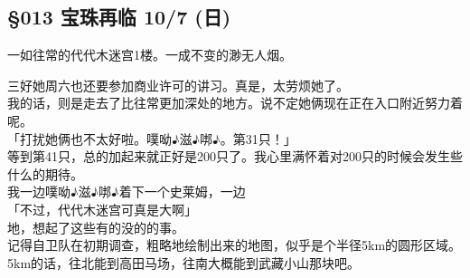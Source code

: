 \subsection{§013 宝珠再临 10/7 (日)}

一如往常的代代木迷宫1楼。一成不变的渺无人烟。

三好她周六也还要参加商业许可的讲习。真是，太劳烦她了。\\

我的话，则是走去了比往常更加深处的地方。说不定她俩现在正在入口附近努力着呢。\\

「打扰她俩也不太好啦。噗呦♪滋♪𠳐♪。第31只！」\\

等到第41只，总的加起来就正好是200只了。我心里满怀着对200只的时候会发生些什么的期待。\\

我一边噗呦♪滋♪𠳐♪着下一个史莱姆，一边\\

「不过，代代木迷宫可真是大啊」\\

地，想起了这些有的没的的事。\\

记得自卫队在初期调查，粗略地绘制出来的地图，似乎是个半径5km的圆形区域。5km的话，往北能到高田马场，往南大概能到武藏小山那块吧。\\

